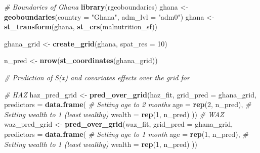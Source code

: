 \documentclass[
  letterpaper,
]{krantz}
\newenvironment{Shaded}{\begin{snugshade}}{\end{snugshade}}
\newcommand{\AttributeTok}[1]{\textcolor[rgb]{0.13,0.29,0.53}{#1}}
\newcommand{\CommentTok}[1]{\textcolor[rgb]{0.56,0.35,0.01}{\textit{#1}}}
\newcommand{\DecValTok}[1]{\textcolor[rgb]{0.00,0.00,0.81}{#1}}
\newcommand{\FunctionTok}[1]{\textcolor[rgb]{0.13,0.29,0.53}{\textbf{#1}}}
\newcommand{\NormalTok}[1]{#1}
\newcommand{\OtherTok}[1]{\textcolor[rgb]{0.56,0.35,0.01}{#1}}
\newcommand{\StringTok}[1]{\textcolor[rgb]{0.31,0.60,0.02}{#1}}
\begin{document}
\begin{Shaded}
\begin{Highlighting}[]
\CommentTok{\# Boundaries of Ghana}
\FunctionTok{library}\NormalTok{(rgeoboundaries)}
\NormalTok{ghana }\OtherTok{\textless{}{-}} \FunctionTok{geoboundaries}\NormalTok{(}\AttributeTok{country =} \StringTok{"Ghana"}\NormalTok{, }\AttributeTok{adm\_lvl =} \StringTok{"adm0"}\NormalTok{)}
\NormalTok{ghana }\OtherTok{\textless{}{-}} \FunctionTok{st\_transform}\NormalTok{(ghana, }\FunctionTok{st\_crs}\NormalTok{(malnutrition\_sf))}

\NormalTok{ghana\_grid }\OtherTok{\textless{}{-}} \FunctionTok{create\_grid}\NormalTok{(ghana, }\AttributeTok{spat\_res =} \DecValTok{10}\NormalTok{)}

\NormalTok{n\_pred }\OtherTok{\textless{}{-}} \FunctionTok{nrow}\NormalTok{(}\FunctionTok{st\_coordinates}\NormalTok{(ghana\_grid))}

\CommentTok{\# Prediction of S(x) and covariates effects over the grid for}

\CommentTok{\# HAZ}
\NormalTok{haz\_pred\_grid }\OtherTok{\textless{}{-}} \FunctionTok{pred\_over\_grid}\NormalTok{(haz\_fit,}
                                \AttributeTok{grid\_pred =}\NormalTok{ ghana\_grid,}
                                \AttributeTok{predictors =} \FunctionTok{data.frame}\NormalTok{(}
                                  \CommentTok{\# Setting age to 2 months}
                                  \AttributeTok{age =} \FunctionTok{rep}\NormalTok{(}\DecValTok{2}\NormalTok{, n\_pred),}
                                  \CommentTok{\# Setting wealth to 1 (least wealthy)}
                                  \AttributeTok{wealth =} \FunctionTok{rep}\NormalTok{(}\DecValTok{1}\NormalTok{, n\_pred)}
\NormalTok{                                ))}
\CommentTok{\# WAZ}
\NormalTok{waz\_pred\_grid }\OtherTok{\textless{}{-}} \FunctionTok{pred\_over\_grid}\NormalTok{(waz\_fit,}
                                \AttributeTok{grid\_pred =}\NormalTok{ ghana\_grid,}
                                \AttributeTok{predictors =} \FunctionTok{data.frame}\NormalTok{(}
                                  \CommentTok{\# Setting age to 1 month}
                                  \AttributeTok{age =} \FunctionTok{rep}\NormalTok{(}\DecValTok{1}\NormalTok{, n\_pred),}
                                  \CommentTok{\# Setting wealth to 1 (least wealthy)}
                                  \AttributeTok{wealth =} \FunctionTok{rep}\NormalTok{(}\DecValTok{1}\NormalTok{, n\_pred)}
\NormalTok{                                ))}
\end{Highlighting}
\end{Shaded}
\end{document}
